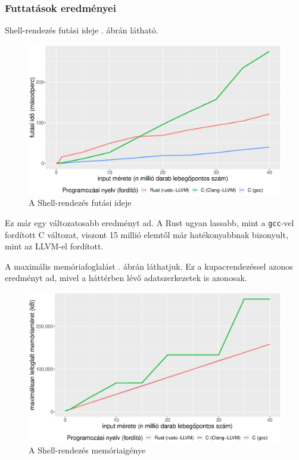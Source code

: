 \subsubsection{Futtatások eredményei}

Shell-rendezés futási ideje . ábrán látható.

\begin{figure}[h!]
\centering
\includegraphics[width=15.5cm]{kepek/shells_sort_run.eps}
\caption{A Shell-rendezés futási ideje}
\label{fig:shellsort}
\end{figure}

Ez már egy változatosabb eredményt ad. A Rust ugyan lassabb, mint a \texttt{gcc}-vel fordított C változat, viszont 15 millió elemtől már hatékonyabbnak bizonyult, mint az LLVM-el fordított.

A maximális memóriafoglalást . ábrán láthatjuk. Ez a kupacrendezéssel azonos eredményt ad, mivel a háttérben lévő adatszerkezetek is azonosak.

\begin{figure}[h!]
\centering
\includegraphics[width=15.5cm]{kepek/shells_sort_memory.eps}
\caption{A Shell-rendezés memóriaigénye}
\label{fig:shellsort_mem}
\end{figure}

